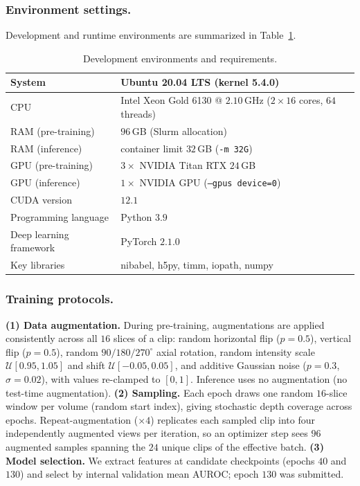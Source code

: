 \documentclass[runningheads]{llncs}
\begin{document}
\subsubsection{Environment settings.}
Development and runtime environments are summarized in Table~\ref{table:env}.

\begin{table}[!htbp]
\caption{Development environments and requirements.}\label{table:env}
\centering
\begin{tabular}{ll}
\hline
System            & Ubuntu 20.04 LTS (kernel 5.4.0) \\ \hline
CPU               & Intel Xeon Gold 6130 @ $2.10$\,GHz ($2{\times}16$ cores, $64$ threads) \\ \hline
RAM (pre-training)& $96$\,GB (Slurm allocation) \\ \hline
RAM (inference)   & container limit $32$\,GB (\texttt{-m 32G}) \\ \hline
GPU (pre-training)& $3\times$ NVIDIA Titan RTX $24$\,GB \\ \hline
GPU (inference)   & $1\times$ NVIDIA GPU (\texttt{--gpus device=0}) \\ \hline
CUDA version      & $12.1$ \\ \hline
Programming language & Python $3.9$ \\ \hline
Deep learning framework & PyTorch $2.1.0$ \\ \hline
Key libraries     & nibabel, h5py, timm, iopath, numpy \\ \hline
\end{tabular}
\end{table}

\subsubsection{Training protocols.}
\textbf{(1) Data augmentation.} During pre-training, augmentations are applied
consistently across all $16$ slices of a clip: random horizontal flip ($p{=}0.5$),
vertical flip ($p{=}0.5$), random $90/180/270^{\circ}$ axial rotation, random
intensity scale $\mathcal{U}[0.95,1.05]$ and shift $\mathcal{U}[-0.05,0.05]$, and
additive Gaussian noise ($p{=}0.3$, $\sigma{=}0.02$), with values re-clamped to
$[0,1]$. Inference uses no augmentation (no test-time augmentation).
\textbf{(2) Sampling.} Each epoch draws one random $16$-slice window per volume
(random start index), giving stochastic depth coverage across epochs.
Repeat-augmentation ($\times4$) replicates each sampled clip into four
independently augmented views per iteration, so an optimizer step sees $96$
augmented samples spanning the $24$ unique clips of the effective batch.
\textbf{(3) Model selection.} We extract features at candidate checkpoints
(epochs $40$ and $130$) and select by internal validation mean AUROC; epoch
$130$ was submitted.
\end{document}
